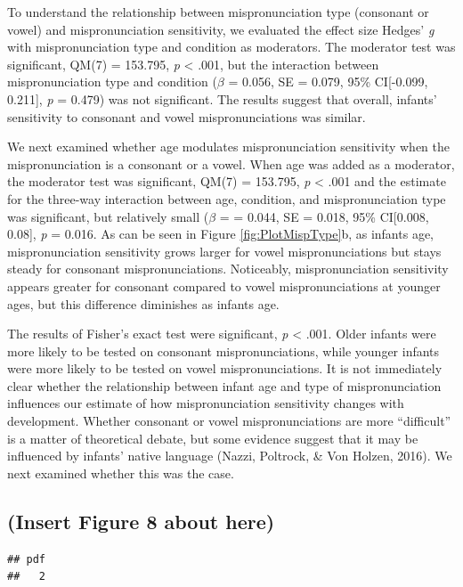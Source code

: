 \documentclass[man]{apa6}
\theoremstyle{definition}
\theoremstyle{definition}
\theoremstyle{definition}
\theoremstyle{remark}
\begin{document}
To understand the relationship between mispronunciation type (consonant
or vowel) and mispronunciation sensitivity, we evaluated the effect size
Hedges' \emph{g} with mispronunciation type and condition as moderators.
The moderator test was significant, QM(7) = 153.795, \emph{p}
\textless{} .001, but the interaction between mispronunciation type and
condition (\(\beta\) = 0.056, SE = 0.079, 95\% CI{[}-0.099, 0.211{]},
\emph{p} = 0.479) was not significant. The results suggest that overall,
infants' sensitivity to consonant and vowel mispronunciations was
similar.

We next examined whether age modulates mispronunciation sensitivity when
the mispronunciation is a consonant or a vowel. When age was added as a
moderator, the moderator test was significant, QM(7) = 153.795, \emph{p}
\textless{} .001 and the estimate for the three-way interaction between
age, condition, and mispronunciation type was significant, but
relatively small (\(\beta\) = = 0.044, SE = 0.018, 95\% CI{[}0.008,
0.08{]}, \emph{p} = 0.016. As can be seen in Figure
\ref{fig:PlotMispType}b, as infants age, mispronunciation sensitivity
grows larger for vowel mispronunciations but stays steady for consonant
mispronunciations. Noticeably, mispronunciation sensitivity appears
greater for consonant compared to vowel mispronunciations at younger
ages, but this difference diminishes as infants age.

The results of Fisher's exact test were significant, \emph{p}
\textless{} .001. Older infants were more likely to be tested on
consonant mispronunciations, while younger infants were more likely to
be tested on vowel mispronunciations. It is not immediately clear
whether the relationship between infant age and type of mispronunciation
influences our estimate of how mispronunciation sensitivity changes with
development. Whether consonant or vowel mispronunciations are more
\enquote{difficult} is a matter of theoretical debate, but some evidence
suggest that it may be influenced by infants' native language (Nazzi,
Poltrock, \& Von Holzen, 2016). We next examined whether this was the
case.

\subsection{(Insert Figure 8 about
here)}\label{insert-figure-8-about-here}

\begin{verbatim}
## pdf 
##   2
\end{verbatim}
\end{document}
